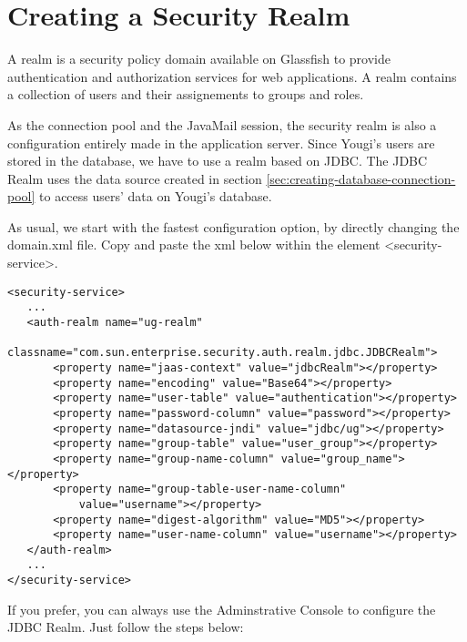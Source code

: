 \documentclass[envcountsame,envcountchap,letterpaper]{svmono}
\begin{document}
\section{Creating a Security Realm}

A realm is a security policy domain available on Glassfish to provide authentication and authorization services for web applications. A realm contains a collection of users and their assignements to groups and roles.

As the connection pool and the JavaMail session, the security realm is also a configuration entirely made in the application server. Since Yougi's users are stored in the database, we have to use a realm based on JDBC. The JDBC Realm uses the data source created in section \ref{sec:creating-database-connection-pool} to access users' data on Yougi's database.

As usual, we start with the fastest configuration option, by directly changing the domain.xml file. Copy and paste the xml below within the element \textless security-service\textgreater .

\begin{verbatim}
<security-service>
   ...
   <auth-realm name="ug-realm"
       classname="com.sun.enterprise.security.auth.realm.jdbc.JDBCRealm">
       <property name="jaas-context" value="jdbcRealm"></property>
       <property name="encoding" value="Base64"></property>
       <property name="user-table" value="authentication"></property>          
       <property name="password-column" value="password"></property>
       <property name="datasource-jndi" value="jdbc/ug"></property>
       <property name="group-table" value="user_group"></property>
       <property name="group-name-column" value="group_name"></property>
       <property name="group-table-user-name-column" 
           value="username"></property>
       <property name="digest-algorithm" value="MD5"></property>
       <property name="user-name-column" value="username"></property>
   </auth-realm>
   ...
</security-service>
\end{verbatim}

If you prefer, you can always use the Adminstrative Console to configure the JDBC Realm. Just follow the steps below:
\end{document}
